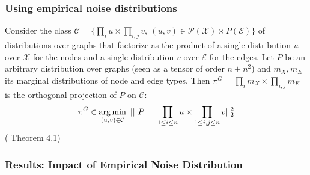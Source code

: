 \documentclass[./presentation.tex]{subfiles}
\begin{document}
\begin{frame}[t,label=digress]
  \frametitle{Using empirical noise distributions}
Consider the class $\mathcal C = \{\prod_i u \times \prod_{i, j} v,~ (u, v) \in \mathcal P(\mathcal{X}) \times P(\mathcal E)\}$ of distributions over graphs that factorize as the product of a single distribution $u$ over $\mathcal X$ for the nodes and a single distribution $v$ over $\mathcal{E}$ for the edges.
Let $P$ be an arbitrary distribution over graphs (seen as a tensor of order $n + n^2$) and $m_X, m_E$ its marginal distributions of node and edge types. Then $\pi^G = \prod_i m_X \times \prod_{i, j} m_E$ is the orthogonal projection of $P$ on $\mathcal{C}$: \vspace{-0.1cm}
\[
\pi^G  \in \operatorname*{arg\,min}_{(u, v) \in \mathcal C}~ ||~P~ -  \prod_{1 \leq i \leq n} u \times \prod_{1 \leq i, j \leq n} v||^2_{2}
\]
(\cite{vignacDiGressDiscreteDenoising2023b} Theorem 4.1)
\end{frame}

\begin{frame}[label=digress]
  \frametitle{Results: Impact of Empirical Noise Distribution}
\end{frame}

\begin{frame}[label=digress]
\end{frame}
\end{document}
